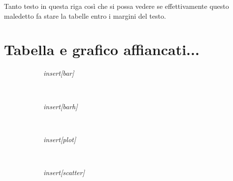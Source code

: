 \documentclass[a4paper, 10pt]{article}
\newcommand{\SRE}[1]{\textit{insert[#1]}}
\begin{document}
Tanto testo in questa riga così che si possa vedere se effettivamente questo maledetto fa stare la tabelle entro i margini del testo.

\tabulinesep=1.5mm

\section*{Tabella e grafico affiancati...}
\begin{figure}[h!]
  \begin{subfigure}[cm]{0.5\linewidth}
    \SRE{bar}
  \end{subfigure}
  ~
  \begin{subfigure}[cm]{0.5\linewidth}    
      \SRE{barh}
  \end{subfigure}
  \\
  \begin{subfigure}[cm]{0.5\linewidth}    
      \SRE{plot}
  \end{subfigure}
  ~ %
  \begin{subfigure}[cm]{0.5\linewidth}    
      \SRE{scatter}
  \end{subfigure}
\end{figure}

\end{document}
